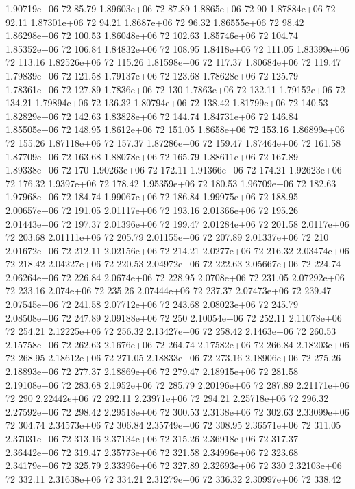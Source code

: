 1.90719e+06 72 85.79
1.89603e+06 72 87.89
1.8865e+06 72 90
1.87884e+06 72 92.11
1.87301e+06 72 94.21
1.8687e+06 72 96.32
1.86555e+06 72 98.42
1.86298e+06 72 100.53
1.86048e+06 72 102.63
1.85746e+06 72 104.74
1.85352e+06 72 106.84
1.84832e+06 72 108.95
1.8418e+06 72 111.05
1.83399e+06 72 113.16
1.82526e+06 72 115.26
1.81598e+06 72 117.37
1.80684e+06 72 119.47
1.79839e+06 72 121.58
1.79137e+06 72 123.68
1.78628e+06 72 125.79
1.78361e+06 72 127.89
1.7836e+06 72 130
1.7863e+06 72 132.11
1.79152e+06 72 134.21
1.79894e+06 72 136.32
1.80794e+06 72 138.42
1.81799e+06 72 140.53
1.82829e+06 72 142.63
1.83828e+06 72 144.74
1.84731e+06 72 146.84
1.85505e+06 72 148.95
1.8612e+06 72 151.05
1.8658e+06 72 153.16
1.86899e+06 72 155.26
1.87118e+06 72 157.37
1.87286e+06 72 159.47
1.87464e+06 72 161.58
1.87709e+06 72 163.68
1.88078e+06 72 165.79
1.88611e+06 72 167.89
1.89338e+06 72 170
1.90263e+06 72 172.11
1.91366e+06 72 174.21
1.92623e+06 72 176.32
1.9397e+06 72 178.42
1.95359e+06 72 180.53
1.96709e+06 72 182.63
1.97968e+06 72 184.74
1.99067e+06 72 186.84
1.99975e+06 72 188.95
2.00657e+06 72 191.05
2.01117e+06 72 193.16
2.01366e+06 72 195.26
2.01443e+06 72 197.37
2.01396e+06 72 199.47
2.01284e+06 72 201.58
2.0117e+06 72 203.68
2.01111e+06 72 205.79
2.01155e+06 72 207.89
2.01337e+06 72 210
2.01672e+06 72 212.11
2.02156e+06 72 214.21
2.0277e+06 72 216.32
2.03474e+06 72 218.42
2.04227e+06 72 220.53
2.04972e+06 72 222.63
2.05667e+06 72 224.74
2.06264e+06 72 226.84
2.0674e+06 72 228.95
2.0708e+06 72 231.05
2.07292e+06 72 233.16
2.074e+06 72 235.26
2.07444e+06 72 237.37
2.07473e+06 72 239.47
2.07545e+06 72 241.58
2.07712e+06 72 243.68
2.08023e+06 72 245.79
2.08508e+06 72 247.89
2.09188e+06 72 250
2.10054e+06 72 252.11
2.11078e+06 72 254.21
2.12225e+06 72 256.32
2.13427e+06 72 258.42
2.1463e+06 72 260.53
2.15758e+06 72 262.63
2.1676e+06 72 264.74
2.17582e+06 72 266.84
2.18203e+06 72 268.95
2.18612e+06 72 271.05
2.18833e+06 72 273.16
2.18906e+06 72 275.26
2.18893e+06 72 277.37
2.18869e+06 72 279.47
2.18915e+06 72 281.58
2.19108e+06 72 283.68
2.1952e+06 72 285.79
2.20196e+06 72 287.89
2.21171e+06 72 290
2.22442e+06 72 292.11
2.23971e+06 72 294.21
2.25718e+06 72 296.32
2.27592e+06 72 298.42
2.29518e+06 72 300.53
2.3138e+06 72 302.63
2.33099e+06 72 304.74
2.34573e+06 72 306.84
2.35749e+06 72 308.95
2.36571e+06 72 311.05
2.37031e+06 72 313.16
2.37134e+06 72 315.26
2.36918e+06 72 317.37
2.36442e+06 72 319.47
2.35773e+06 72 321.58
2.34996e+06 72 323.68
2.34179e+06 72 325.79
2.33396e+06 72 327.89
2.32693e+06 72 330
2.32103e+06 72 332.11
2.31638e+06 72 334.21
2.31279e+06 72 336.32
2.30997e+06 72 338.42
